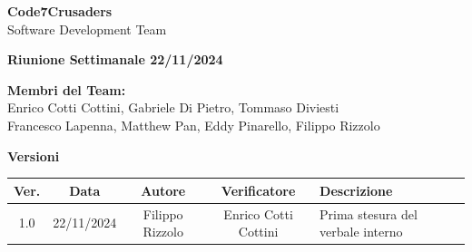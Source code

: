 \documentclass{article}
\begin{document}
\begin{titlepage}
    {\Huge \textbf{Code7Crusaders}}\\
    \vspace{0.5cm}
    {\Large Software Development Team}\\
    \vspace{2cm}
    
    {\large \textbf{Riunione Settimanale 22/11/2024}}\\ 
    \vspace{5cm}                           
    
    
    \textbf{Membri del Team:}\\
    Enrico Cotti Cottini, Gabriele Di Pietro, Tommaso Diviesti \\
    Francesco Lapenna, Matthew Pan, Eddy Pinarello, Filippo Rizzolo \\
    \vspace{0.5cm}
    
    \vspace{1cm}
\end{titlepage}



\newpage
\begin{table}[h!]
\centering
\textbf{Versioni} \\ %
\vspace{2mm} %
\begin{tabular}{|c|c|c|c|>{\raggedright\arraybackslash}p{}|}
    \hline
    \textbf{Ver.} & \textbf{Data} & \textbf{Autore} & \textbf{Verificatore} & \textbf{Descrizione} \\
    \hline
    1.0 & 22/11/2024 & Filippo Rizzolo & Enrico Cotti Cottini & Prima stesura del verbale interno \\ 
    \hline                                  
\end{tabular}
\end{table}



\newpage
\tableofcontents



\newpage
\end{document}
